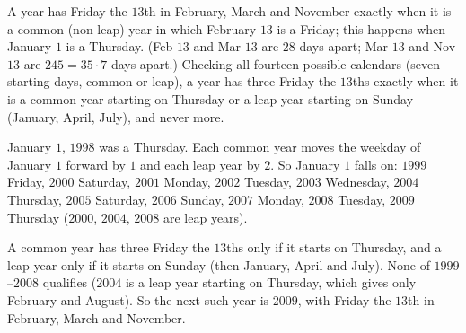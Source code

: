 A year has Friday the $13$th in February, March and November exactly when it is a common (non-leap) year in which February $13$ is a Friday; this happens when January $1$ is a Thursday. (Feb $13$ and Mar $13$ are $28$ days apart; Mar $13$ and Nov $13$ are $245=35\cdot7$ days apart.) Checking all fourteen possible calendars (seven starting days, common or leap), a year has three Friday the $13$ths exactly when it is a common year starting on Thursday or a leap year starting on Sunday (January, April, July), and never more.

January $1$, $1998$ was a Thursday. Each common year moves the weekday of January $1$ forward by $1$ and each leap year by $2$. So January $1$ falls on: $1999$ Friday, $2000$ Saturday, $2001$ Monday, $2002$ Tuesday, $2003$ Wednesday, $2004$ Thursday, $2005$ Saturday, $2006$ Sunday, $2007$ Monday, $2008$ Tuesday, $2009$ Thursday ($2000$, $2004$, $2008$ are leap years).

A common year has three Friday the $13$ths only if it starts on Thursday, and a leap year only if it starts on Sunday (then January, April and July). None of $1999$--$2008$ qualifies ($2004$ is a leap year starting on Thursday, which gives only February and August). So the next such year is $\boxed{2009}$, with Friday the $13$th in February, March and November.
